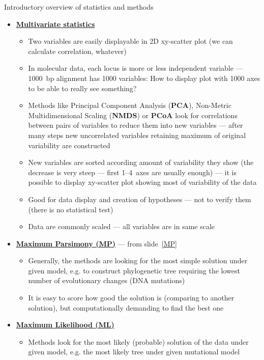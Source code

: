 \documentclass[compress, ucs, xelatex, 11pt, xcolor=svgnames, aspectratio=169,
	hyperref={
		bookmarks=true,
		unicode=true,
		colorlinks=true,
		pdftitle={Molecular data in R},
		plainpages=false,
		pdfauthor={Vojtech Zeisek},
		pdfsubject={Course about phylogeny and evolution in R},
		pdfcreator={XeLaTeX},
		pdfkeywords={R, evolution, phylogeny, molecular data},
		linkcolor=Crimson, %
		anchorcolor=Magenta, %
		citecolor=Magenta, %
		filecolor=Magenta, %
		menucolor=Magenta, %
		urlcolor=DodgerBlue, %
		pdftex},
	url={hyphens, lowtilde} %
	]{beamer}
\begin{document}
\begin{frame}[allowframebreaks]{Introductory overview of statistics and methods}
\begin{itemize}
\begin{itemize}
			\end{itemize}
		\item \textbf{\href{https://en.wikipedia.org/wiki/Multivariate_statistics}{Multivariate statistics}}
		\begin{itemize}
			\item Two variables are easily displayable in 2D xy-scatter plot (we can calculate correlation, whatever)
			\item In molecular data, each locus is more or less independent variable --- 1000~bp alignment has 1000 variables: How to display plot with 1000 axes to be able to really see something?
			\item Methods like Principal Component Analysis (\textbf{PCA}), Non-Metric Multidimensional Scaling (\textbf{NMDS}) or \textbf{PCoA} look for correlations between pairs of variables to reduce them into new variables --- after many steps new uncorrelated variables retaining maximum of original variability are constructed
			\item New variables are sorted according amount of variability they show (the decrease is very steep --- first 1--4~axes are usually enough) --- it is possible to display xy-scatter plot showing most of variability of the data
			\item Good for data display and creation of hypotheses --- not to verify them (there is no statistical test)
			\item Data are commonly scaled --- all variables are in same scale
		\end{itemize}
		\item \textbf{\href{https://en.wikipedia.org/wiki/Maximum_parsimony_(phylogenetics)}{Maximum Parsimony (MP)}} --- from slide~\ref{MP}
		\begin{itemize}
			\item Generally, the methods are looking for the most simple solution under given model, e.g. to construct phylogenetic tree requiring the lowest number of evolutionary changes (DNA mutations)
			\item It is easy to score how good the solution is (comparing to another solution), but computationally demanding to find the best one
		\end{itemize}
		\item \textbf{\href{https://en.wikipedia.org/wiki/Maximum_likelihood_estimation}{Maximum Likelihood (ML)}}
		\begin{itemize}
			\item Methods look for the most likely (probable) solution of the data under given model, e.g. the most likely tree under given mutational model

\end{itemize}
\end{itemize}
\end{frame}
\end{document}
